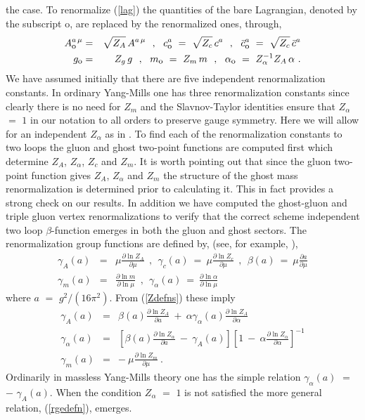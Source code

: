 \documentclass[a4paper,11pt]{article}
\begin{document}
the case. To renormalize (\ref{lag}) the quantities of the bare Lagrangian,
denoted by the subscript $\mbox{o}$, are replaced by the renormalized ones, 
through,  
\begin{eqnarray} 
A^{a \, \mu}_{\mbox{\footnotesize{o}}} &=& \sqrt{Z_A} \, A^{a \, \mu} ~~,~~ 
c^a_{\mbox{\footnotesize{o}}} ~=~ \sqrt{Z_c} \, c^a ~~,~~ 
\bar{c}^a_{\mbox{\footnotesize{o}}} ~=~ \sqrt{Z_c} \, \bar{c}^a \nonumber \\ 
g_{\mbox{\footnotesize{o}}} &=& Z_g \, g ~~,~~ m_{\mbox{\footnotesize{o}}} ~=~ 
Z_m \, m ~~,~~ \alpha_{\mbox{\footnotesize{o}}} ~=~ Z^{-1}_\alpha Z_A \, 
\alpha ~. 
\label{Zdefns}
\end{eqnarray} 
We have assumed initially that there are five independent renormalization
constants. In ordinary Yang-Mills one has three renormalization constants since
clearly there is no need for $Z_m$ and the Slavnov-Taylor identities ensure 
that $Z_\alpha$ $=$ $1$ in our notation to all orders to preserve gauge 
symmetry. Here we will allow for an independent $Z_\alpha$ as in \cite{4}. To 
find each of the renormalization constants to two loops the gluon and ghost 
two-point functions are computed first which determine $Z_A$, $Z_\alpha$, $Z_c$
and $Z_m$. It is worth pointing out that since the gluon two-point function 
gives $Z_A$, $Z_\alpha$ and $Z_m$ the structure of the ghost mass 
renormalization is determined prior to calculating it. This in fact provides a 
strong check on our results. In addition we have computed the ghost-gluon and 
triple gluon vertex renormalizations to verify that the correct scheme 
independent two loop $\beta$-function emerges in both the gluon and ghost 
sectors. The renormalization group functions are defined by, (see, for example,
\cite{20}), 
\begin{eqnarray} 
\gamma_A(a) &=& \mu \frac{\partial \ln Z_A}{\partial \mu} ~~,~~  
\gamma_c(a) ~=~ \mu \frac{\partial \ln Z_c}{\partial \mu} ~~,~~  
\beta(a) ~=~ \mu \frac{\partial a}{\partial \mu} \nonumber \\  
\gamma_m(a) &=& \frac{\partial \ln m}{\partial \ln \mu} ~~,~~ 
\gamma_\alpha(a) ~=~ \frac{\partial \ln \alpha}{\partial \ln \mu} 
\end{eqnarray} 
where $a$ $=$ $g^2/(16\pi^2)$. From (\ref{Zdefns}) these imply 
\begin{eqnarray} 
\gamma_A(a) &=& \beta(a) \frac{\partial \ln Z_A}{\partial a} ~+~
\alpha \gamma_\alpha(a) \frac{\partial \ln Z_A}{\partial \alpha} \nonumber \\
\gamma_\alpha(a) &=& \left[ \beta(a) \frac{\partial \ln Z_\alpha}{\partial a} 
{}~-~ \gamma_A(a) \right] \left[ 1 ~-~ \alpha \frac{\partial 
\ln Z_\alpha}{\partial \alpha} \right]^{-1} \nonumber \\ 
\gamma_m(a) &=& -~ \mu \frac{\partial \ln Z_m}{\partial \mu} ~. 
\label{rgedefn} 
\end{eqnarray} 
Ordinarily in massless Yang-Mills theory one has the simple relation 
$\gamma_\alpha(a)$ $=$ $-$ $\gamma_A(a)$. When the condition $Z_\alpha$ $=$ $1$
is not satisfied the more general relation, (\ref{rgedefn}), emerges.
\end{document}
